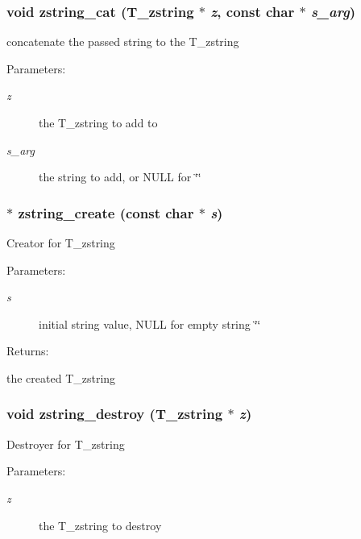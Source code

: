 \subsubsection{\setlength{\rightskip}{0pt plus 5cm}void zstring\_\-cat ({\bf T\_\-zstring} $\ast$ {\em z}, const char $\ast$ {\em s\_\-arg})}\label{zstring_8h_a4}


concatenate the passed string to the T\_\-zstring\begin{Desc}
\item[Parameters: ]\par
\begin{description}
\item[{\em 
z}]the T\_\-zstring to add to \item[{\em 
s\_\-arg}]the string to add, or NULL for \char`\"{}\char`\"{} \end{description}
\end{Desc}
\subsubsection{$\ast$ zstring\_\-create (const char $\ast$ {\em s})}\label{zstring_8h_a1}


Creator for T\_\-zstring\begin{Desc}
\item[Parameters: ]\par
\begin{description}
\item[{\em 
s}]initial string value, NULL for empty string \char`\"{}\char`\"{} \end{description}
\end{Desc}
\begin{Desc}
\item[Returns: ]\par
the created T\_\-zstring \end{Desc}
\subsubsection{\setlength{\rightskip}{0pt plus 5cm}void zstring\_\-destroy ({\bf T\_\-zstring} $\ast$ {\em z})}\label{zstring_8h_a2}


Destroyer for T\_\-zstring\begin{Desc}
\item[Parameters: ]\par
\begin{description}
\item[{\em 
z}]the T\_\-zstring to destroy \end{description}
\end{Desc}
